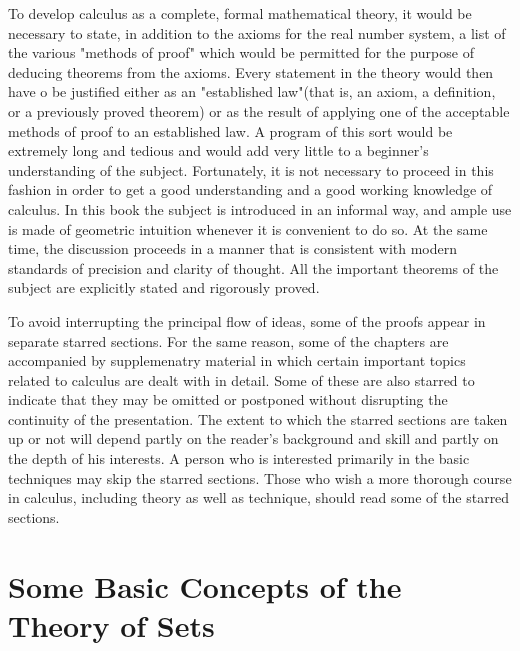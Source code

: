 \documentclass[cn,11pt,chinese]{elegantbook}
\numberwithin{equation}{section}
\begin{document}
To develop calculus as a complete, formal mathematical theory, it would be necessary to state, in addition to the axioms for the real number system, a list of the various "methods of proof" which would be permitted for the purpose of deducing theorems from the axioms. Every statement in the theory would then have o be justified either as an "established law"(that is, an axiom, a definition, or a previously proved theorem) or as the result of applying one of the acceptable methods of proof to an established law. A program of this sort would be extremely long and tedious and would add very little to a beginner's understanding of the subject. Fortunately, it is not necessary to proceed in this fashion in order to get a good understanding and a good working knowledge of calculus. In this book the subject is introduced in an informal way, and ample use is made of geometric intuition whenever it is convenient to do so. At the same time, the discussion proceeds in a manner that is consistent with modern standards of precision and clarity of thought. All the important theorems of the subject are explicitly stated and rigorously proved.

To avoid interrupting the principal flow of ideas, some of the proofs appear in separate starred sections. For the same reason, some of the chapters are accompanied by supplemenatry material in which certain important topics related to calculus are dealt with in detail. Some of these are also starred to indicate that they may be omitted or postponed without disrupting the continuity of the presentation. The extent to which the starred sections are taken up or not will depend partly on the reader's background and skill and partly on the depth of his interests. A person who is interested primarily in the basic techniques may skip the starred sections. Those who wish a more thorough course in calculus, including theory as well as technique, should read some of the starred sections.



\section{Some Basic Concepts of the Theory of Sets}\label{section00102}
\end{document}
